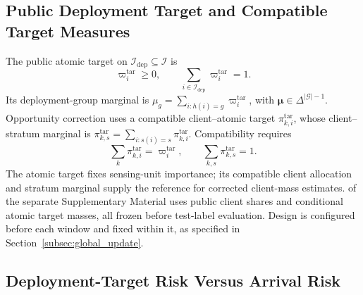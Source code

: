 \documentclass[letterpaper,journal]{IEEEtran}
\begin{document}
\subsection{Public Deployment Target and Compatible Target Measures}
\label{subsec:target_measures}

The public atomic target on $\mathcal I_{\mathrm{dep}}\subseteq\mathcal I$ is
\begin{equation}
    \varpi_i^{\mathrm{tar}}\ge0,
    \qquad
    \sum_{i\in\mathcal{I}_{\mathrm{dep}}}
    \varpi_i^{\mathrm{tar}}=1.
    \label{eq:atomic_target}
\end{equation}
Its deployment-group marginal is
$\mu_g=\sum_{i:h(i)=g}\varpi_i^{\mathrm{tar}}$, with
$\boldsymbol\mu\in\Delta^{|\mathcal G|-1}$.  Opportunity correction uses a
compatible client--atomic target $\pi^{\mathrm{tar}}_{k,i}$, whose
client--stratum marginal is
$\pi^{\mathrm{tar}}_{k,s}=\sum_{i:s(i)=s}\pi^{\mathrm{tar}}_{k,i}$.
Compatibility requires
\begin{equation}
    \sum_k\pi^{\mathrm{tar}}_{k,i}
    =
    \varpi_i^{\mathrm{tar}},
    \qquad
    \sum_{k,s}\pi^{\mathrm{tar}}_{k,s}=1.
    \label{eq:target_compatibility}
\end{equation}
The atomic target fixes sensing-unit importance; its compatible client
allocation and stratum marginal supply the reference for corrected
client-mass estimates.
 of the separate Supplementary Material uses public
client shares and conditional atomic target masses, all frozen before
test-label evaluation.  Design is configured before each window and fixed
within it, as specified in Section~\ref{subsec:global_update}.

\subsection{Deployment-Target Risk Versus Arrival Risk}
\label{subsec:target_risk}
\end{document}
